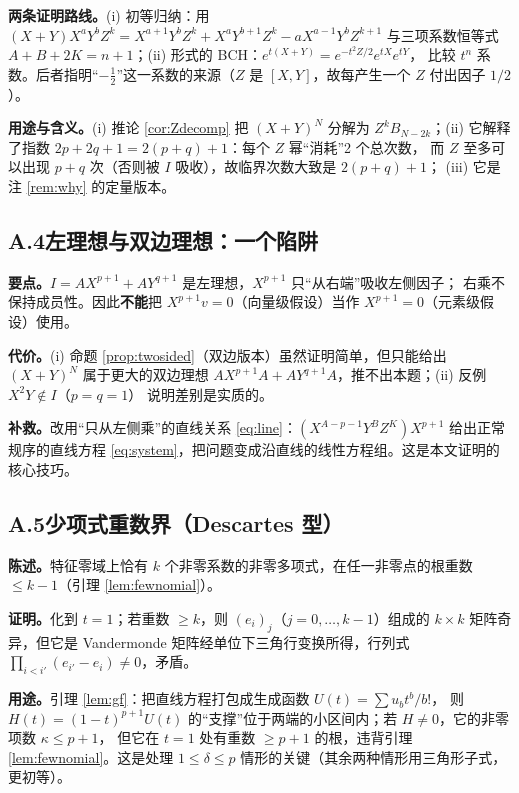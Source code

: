 \documentclass[11pt,UTF8]{ctexart}
\theoremstyle{definition}
\begin{document}
\noindent\textbf{两条证明路线。}(i) 初等归纳：用 $(X+Y)X^aY^bZ^k=X^{a+1}Y^bZ^k+X^aY^{b+1}Z^k-aX^{a-1}Y^bZ^{k+1}$
与三项系数恒等式 $A+B+2K=n+1$；(ii) 形式的 BCH：$e^{t(X+Y)}=e^{-t^2Z/2}e^{tX}e^{tY}$，
比较 $t^n$ 系数。后者指明“$-\frac12$”这一系数的来源（$Z$ 是 $[X,Y]$，故每产生一个 $Z$ 付出因子 $1/2$）。

\noindent\textbf{用途与含义。}(i) 推论 \ref{cor:Zdecomp} 把 $(X+Y)^N$ 分解为
$Z^kB_{N-2k}$；(ii) 它解释了指数 $2p+2q+1=2(p+q)+1$：每个 $Z$ 幂“消耗”2 个总次数，
而 $Z$ 至多可以出现 $p+q$ 次（否则被 $I$ 吸收），故临界次数大致是 $2(p+q)+1$；
(iii) 它是注 \ref{rem:why} 的定量版本。

\subsection*{A.4\quad 左理想与双边理想：一个陷阱}

\noindent\textbf{要点。}$I=AX^{p+1}+AY^{q+1}$ 是左理想，$X^{p+1}$ 只“从右端”吸收左侧因子；
右乘不保持成员性。因此\textbf{不能}把 $X^{p+1}v=0$（向量级假设）当作 $X^{p+1}=0$（元素级假设）使用。

\noindent\textbf{代价。}(i) 命题 \ref{prop:twosided}（双边版本）虽然证明简单，但只能给出
$(X+Y)^N$ 属于更大的双边理想 $AX^{p+1}A+AY^{q+1}A$，推不出本题；(ii) 反例 $X^2Y\notin I$（$p=q=1$）
说明差别是实质的。

\noindent\textbf{补救。}改用“只从左侧乘”的直线关系 \eqref{eq:line}：$(X^{A-p-1}Y^BZ^K)X^{p+1}$
给出正常规序的直线方程 \eqref{eq:system}，把问题变成沿直线的线性方程组。这是本文证明的核心技巧。

\subsection*{A.5\quad 少项式重数界（Descartes 型）}

\noindent\textbf{陈述。}特征零域上恰有 $k$ 个非零系数的非零多项式，在任一非零点的根重数 $\le k-1$（引理 \ref{lem:fewnomial}）。

\noindent\textbf{证明。}化到 $t=1$；若重数 $\ge k$，则 $(e_i)_j$（$j=0,\dots,k-1$）组成的
$k\times k$ 矩阵奇异，但它是 Vandermonde 矩阵经单位下三角行变换所得，行列式
$\prod_{i<i'}(e_{i'}-e_i)\ne0$，矛盾。

\noindent\textbf{用途。}引理 \ref{lem:gf}：把直线方程打包成生成函数 $U(t)=\sum u_bt^b/b!$，
则 $H(t)=(1-t)^{p+1}U(t)$ 的“支撑”位于两端的小区间内；若 $H\ne0$，它的非零项数 $\kappa\le p+1$，
但它在 $t=1$ 处有重数 $\ge p+1$ 的根，违背引理 \ref{lem:fewnomial}。这是处理 $1\le\delta\le p$
情形的关键（其余两种情形用三角形子式，更初等）。
\end{document}
